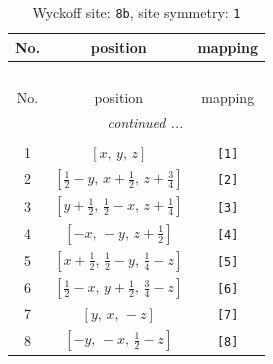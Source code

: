 \documentclass[fleqn,8pt]{jsarticle}
\begin{document}
\begin{longtable}{ccc}
\caption{Wyckoff site: {\tt 8b}, site symmetry: {\tt 1}}
 \\
 \hline \hline
No. & position & mapping \\ \hline \endfirsthead

\multicolumn{2}{l}{\tablename\ \thetable{}} \\
 \hline \hline
No. & position & mapping \\ \hline \endhead

 \hline \hline
\multicolumn{2}{r}{\footnotesize\it continued ...} \\ \endfoot

 \hline \hline
\multicolumn{2}{r}{} \\ \endlastfoot

1 & $\left[ x,\, y,\, z \right]$ & {\tt [1]} \\ \hline
2 & $\left[ \frac{1}{2} - y,\, x + \frac{1}{2},\, z + \frac{3}{4} \right]$ & {\tt [2]} \\ \hline
3 & $\left[ y + \frac{1}{2},\, \frac{1}{2} - x,\, z + \frac{1}{4} \right]$ & {\tt [3]} \\ \hline
4 & $\left[ - x,\, - y,\, z + \frac{1}{2} \right]$ & {\tt [4]} \\ \hline
5 & $\left[ x + \frac{1}{2},\, \frac{1}{2} - y,\, \frac{1}{4} - z \right]$ & {\tt [5]} \\ \hline
6 & $\left[ \frac{1}{2} - x,\, y + \frac{1}{2},\, \frac{3}{4} - z \right]$ & {\tt [6]} \\ \hline
7 & $\left[ y,\, x,\, - z \right]$ & {\tt [7]} \\ \hline
8 & $\left[ - y,\, - x,\, \frac{1}{2} - z \right]$ & {\tt [8]} \\
\end{longtable}
\end{document}
